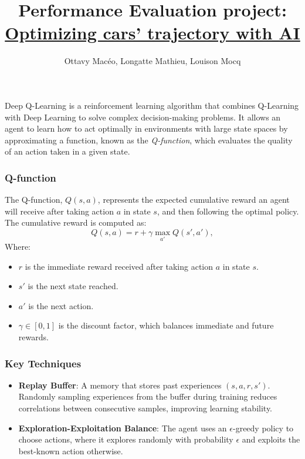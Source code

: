 \documentclass[11pt,a4paper]{article}
\title{\vspace{-1.0cm}Performance Evaluation project:\\\underline{Optimizing cars' trajectory with AI}}
\date{}
\author{\vspace{-1cm}Ottavy Macéo, Longatte Mathieu, Louison Mocq}
\begin{document}
    Deep Q-Learning is a reinforcement learning algorithm that combines Q-Learning with Deep Learning to solve complex decision-making problems. 
    It allows an agent to learn how to act optimally in environments with large state spaces by approximating a function, known as the \textit{Q-function}, which evaluates the quality of an action taken in a given state.
    
    \subsubsection*{Q-function}
    The Q-function, $Q(s, a)$, represents the expected cumulative reward an agent will receive after taking action $a$ in state $s$, and then following the optimal policy. The cumulative reward is computed as:
    \[
    Q(s, a) = r + \gamma \max_{a'} Q(s', a'),
    \]
    Where:
    \begin{itemize}
        \item $r$ is the immediate reward received after taking action $a$ in state $s$.
        \item $s'$ is the next state reached.
        \item $a'$ is the next action.
        \item $\gamma \in [0, 1]$ is the discount factor, which balances immediate and future rewards.
    \end{itemize}
    
    
    \subsubsection*{Key Techniques}
    \begin{itemize}
        \item \textbf{Replay Buffer}: A memory that stores past experiences $(s, a, r, s')$. Randomly sampling experiences from the buffer during training reduces correlations between consecutive samples, improving learning stability.
        \item \textbf{Exploration-Exploitation Balance}: The agent uses an $\epsilon$-greedy policy to choose actions, where it explores randomly with probability $\epsilon$ and exploits the best-known action otherwise.
    \end{itemize}
    
\end{document}
